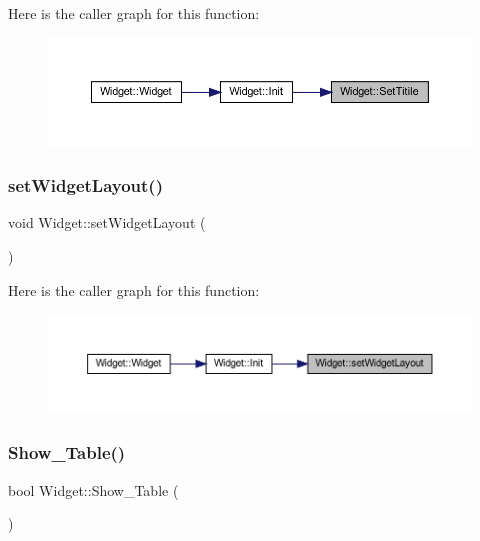Here is the caller graph for this function\+:
\nopagebreak
\begin{figure}[H]
\begin{center}
\leavevmode
\includegraphics[width=350pt]{class_widget_a8499caa320e65f51b4ccf7d77ff82176_icgraph}
\end{center}
\end{figure}
\mbox{\label{class_widget_a1b530946ccda60d3b1bd124360d93c4f}} 
\subsubsection{\texorpdfstring{setWidgetLayout()}{setWidgetLayout()}}
{\footnotesize\ttfamily void Widget\+::set\+Widget\+Layout (\begin{DoxyParamCaption}{ }\end{DoxyParamCaption})}

Here is the caller graph for this function\+:
\nopagebreak
\begin{figure}[H]
\begin{center}
\leavevmode
\includegraphics[width=350pt]{class_widget_a1b530946ccda60d3b1bd124360d93c4f_icgraph}
\end{center}
\end{figure}
\mbox{\label{class_widget_a426f2aea1215a9b0120eb56e986ce1e9}} 
\subsubsection{\texorpdfstring{Show\_Table()}{Show\_Table()}}
{\footnotesize\ttfamily bool Widget\+::\+Show\+\_\+\+Table (\begin{DoxyParamCaption}{ }\end{DoxyParamCaption})}

